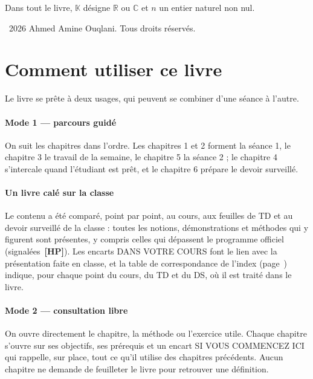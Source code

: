 \documentclass[a4paper,11pt]{article}
\numberwithin{equation}{section}
\numberwithin{figure}{section}
\numberwithin{table}{section}
\theoremstyle{enonce}
\theoremstyle{exemple}
\theoremstyle{remarque}
\newcommand{\K}{\mathbb{K}}
\newcommand{\R}{\mathbb{R}}
\newcommand{\C}{\mathbb{C}}
\newcommand{\HP}{\,{\sffamily\bfseries\scriptsize\textcolor{Brique}{[HP]}}}
\begin{document}
Dans tout le livre, $\K$ désigne $\R$ ou $\C$ et $n$ un entier naturel non nul.

\vfill
{\footnotesize\sffamily\color{Gris}\textcopyright~2026 Ahmed Amine Ouqlani. Tous droits réservés.\par}

\clearpage
\thispagestyle{plain}
\section*{Comment utiliser ce livre}

Le livre se prête à deux usages, qui peuvent se combiner d'une séance à l'autre.

\paragraph{Mode 1 --- parcours guidé} On suit les chapitres dans l'ordre. Les chapitres 1 et 2 forment la séance 1, le
chapitre 3 le travail de la semaine, le chapitre 5 la séance 2 ; le chapitre 4 s'intercale quand l'étudiant est prêt,
et le chapitre 6 prépare le devoir surveillé.

\paragraph{Un livre calé sur la classe} Le contenu a été comparé, point par point, au cours, aux feuilles de TD et au
devoir surveillé de la classe : toutes les notions, démonstrations et méthodes qui y figurent sont présentes, y compris
celles qui dépassent le programme officiel (signalées \HP). Les encarts \textsf{\small\color{Ocre}DANS VOTRE COURS}
font le lien avec la présentation faite en classe, et la table de correspondance de l'index (page~\pageref{sec:corresp})
indique, pour chaque point du cours, du TD et du DS, où il est traité dans le livre.

\paragraph{Mode 2 --- consultation libre} On ouvre directement le chapitre, la méthode ou l'exercice utile. Chaque chapitre
s'ouvre sur ses objectifs, ses prérequis et un encart \textsf{\small\color{Gris}SI VOUS COMMENCEZ ICI} qui rappelle, sur place,
tout ce qu'il utilise des chapitres précédents. Aucun chapitre ne demande de feuilleter le livre pour retrouver une
définition.
\end{document}
